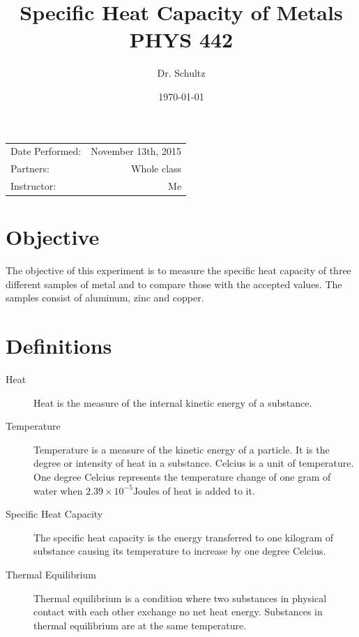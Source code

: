 \documentclass{article}
\title{Specific Heat Capacity of Metals \\ PHYS 442} %
\author{Dr. Schultz } %
\date{\today} %
\begin{document}
\maketitle %

\begin{center}
\begin{tabular}{l r}
Date Performed: & November 13th, 2015 \\ %
Partners: & Whole class \\ %
Instructor: & Me %
\end{tabular}
\end{center}



\section{Objective}

The objective of this experiment is to measure the specific heat capacity of three different samples of metal and to compare those with the accepted values.  The samples consist of aluminum, zinc and copper.

\section{Definitions}
\label{definitions}
\begin{description}
\item[Heat]
Heat is the measure of the internal kinetic energy of a substance.
\item[Temperature]
Temperature is a measure of the kinetic energy of a particle.  It is the degree or intensity of heat in a substance.  Celcius is a unit of temperature.  One degree Celcius represents the temperature change of one gram of water when $2.39\times10^{-5}\text{Joules}$ of heat is added to it.

\item[Specific Heat Capacity]
The specific heat capacity is the energy transferred to one kilogram of substance causing its temperature to increase by one degree Celcius.\cite{Homer:2014}

\item[Thermal Equilibrium]
Thermal equilibrium is a condition where two substances in physical contact with each other exchange no net heat energy.  Substances in thermal equilibrium are at the same temperature.
\end{description}
\end{document}
